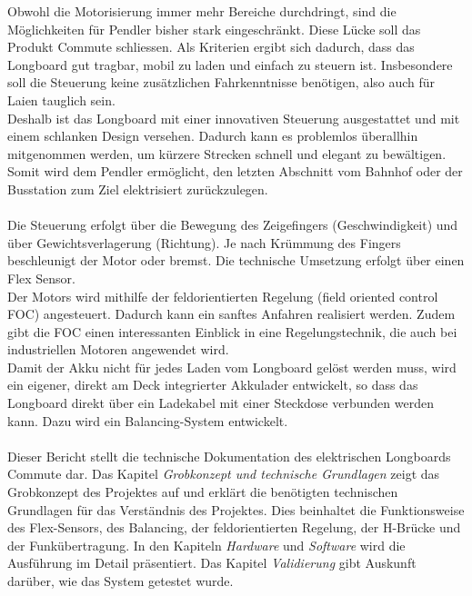 Obwohl die Motorisierung immer mehr Bereiche durchdringt, sind die Möglichkeiten für Pendler bisher stark eingeschränkt. Diese Lücke soll das Produkt Commute schliessen.
Als Kriterien ergibt sich dadurch, dass das Longboard gut tragbar, mobil zu laden und einfach zu steuern ist. Insbesondere soll die Steuerung keine zusätzlichen Fahrkenntnisse benötigen, also auch für Laien tauglich sein.\\
Deshalb ist das Longboard mit einer innovativen Steuerung ausgestattet und mit einem schlanken Design versehen. Dadurch kann es problemlos überallhin mitgenommen werden, um kürzere Strecken schnell und elegant zu bewältigen. Somit wird dem Pendler ermöglicht, den letzten Abschnitt vom Bahnhof oder der Busstation zum Ziel elektrisiert zurückzulegen. 
\\ \\
Die Steuerung erfolgt über die Bewegung des Zeigefingers (Geschwindigkeit) und über Gewichtsverlagerung (Richtung). Je nach Krümmung des Fingers beschleunigt der Motor oder bremst. Die technische Umsetzung erfolgt über einen Flex Sensor. \\
Der Motors wird mithilfe der feldorientierten Regelung (field oriented control FOC) angesteuert. Dadurch kann ein sanftes Anfahren realisiert werden. Zudem gibt die FOC einen interessanten Einblick in eine Regelungstechnik, die auch bei industriellen Motoren angewendet wird. \\
Damit der Akku nicht für jedes Laden vom Longboard gelöst werden muss, wird ein eigener, direkt am Deck integrierter Akkulader entwickelt, so dass das Longboard direkt über ein Ladekabel mit einer Steckdose verbunden werden kann. Dazu wird ein Balancing-System entwickelt.
\\\\
Dieser Bericht stellt die technische Dokumentation des elektrischen Longboards Commute dar. Das Kapitel \textit{Grobkonzept und technische Grundlagen} zeigt das Grobkonzept des Projektes auf und erklärt die benötigten technischen Grundlagen für das Verständnis des Projektes. Dies beinhaltet die Funktionsweise des Flex-Sensors, des Balancing, der feldorientierten Regelung, der H-Brücke und der Funkübertragung. In den Kapiteln \textit{Hardware} und \textit{Software} wird die Ausführung im Detail präsentiert. Das Kapitel \textit{Validierung} gibt Auskunft darüber, wie das System getestet wurde. 
